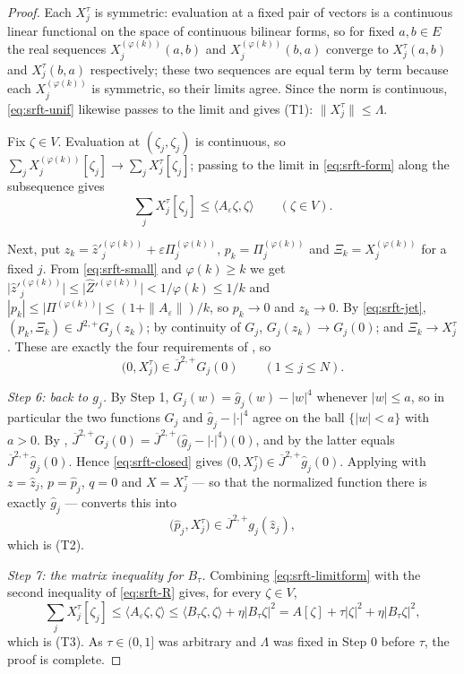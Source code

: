 \begin{proof}
Each $X_j^\tau$ is symmetric: evaluation at a fixed pair of vectors is a
continuous linear functional on the space of continuous bilinear forms, so for
fixed $a,b\in E$ the real sequences $X_j^{(\varphi(k))}(a,b)$ and
$X_j^{(\varphi(k))}(b,a)$ converge to $X_j^\tau(a,b)$ and $X_j^\tau(b,a)$
respectively; these two sequences are equal term by term because each
$X_j^{(\varphi(k))}$ is symmetric, so their limits agree. Since the norm is
continuous, \eqref{eq:srft-unif} likewise passes to the limit and gives (T1):
$\|X_j^\tau\|\le\Lambda$.

Fix $\zeta\in V$. Evaluation at $(\zeta_j,\zeta_j)$ is continuous, so
$\sum_jX_j^{(\varphi(k))}[\zeta_j]\to\sum_jX_j^\tau[\zeta_j]$; passing to the
limit in \eqref{eq:srft-form} along the subsequence gives
\begin{equation}\label{eq:srft-limitform}
  \sum_jX_j^\tau[\zeta_j]\le\langle A_\varepsilon\zeta,\zeta\rangle
  \qquad(\zeta\in V).
\end{equation}

Next, put $z_k=\widehat z'^{(\varphi(k))}_j+\varepsilon\Pi_j^{(\varphi(k))}$,
$p_k=\Pi_j^{(\varphi(k))}$ and $\Xi_k=X_j^{(\varphi(k))}$ for a fixed $j$. From
\eqref{eq:srft-small} and $\varphi(k)\ge k$ we get
$\bigl|\widehat z'^{(\varphi(k))}_j\bigr|
\le\bigl|\widehat Z'^{(\varphi(k))}\bigr|<1/\varphi(k)\le1/k$ and
$|p_k|\le\bigl|\Pi^{(\varphi(k))}\bigr|\le(1+\|A_\varepsilon\|)/k$, so
$p_k\to0$ and $z_k\to0$. By \eqref{eq:srft-jet},
$(p_k,\Xi_k)\in J^{2,+}G_j(z_k)$; by continuity of $G_j$, $G_j(z_k)\to G_j(0)$;
and $\Xi_k\to X_j^\tau$. These are exactly the four requirements of
, so
\begin{equation}\label{eq:srft-closed}
  \bigl(0,X_j^\tau\bigr)\in\overline J^{2,+}G_j(0)\qquad(1\le j\le N).
\end{equation}

\emph{Step 6: back to $g_j$.}
By Step 1, $G_j(w)=\widehat g_j(w)-|w|^4$ whenever $|w|\le a$, so in particular
the two functions $G_j$ and $\widehat g_j-|\cdot|^4$ agree on the ball
$\{|w|<a\}$ with $a>0$. By ,
$\overline J^{2,+}G_j(0)=\overline J^{2,+}\bigl(\widehat g_j-|\cdot|^4\bigr)(0)$,
and by  the latter equals
$\overline J^{2,+}\widehat g_j(0)$. Hence \eqref{eq:srft-closed} gives
$\bigl(0,X_j^\tau\bigr)\in\overline J^{2,+}\widehat g_j(0)$. Applying
 with $z=\widehat z_j$, $p=\widehat p_j$,
$q=0$ and $X=X_j^\tau$ --- so that the normalized function there is exactly
$\widehat g_j$ --- converts this into
\[
  \bigl(\widehat p_j,X_j^\tau\bigr)\in\overline J^{2,+}g_j(\widehat z_j),
\]
which is (T2).

\emph{Step 7: the matrix inequality for $B_\tau$.}
Combining \eqref{eq:srft-limitform} with the second inequality of
\eqref{eq:srft-R} gives, for every $\zeta\in V$,
\[
  \sum_jX_j^\tau[\zeta_j]\le\langle A_\varepsilon\zeta,\zeta\rangle
   \le\langle B_\tau\zeta,\zeta\rangle+\eta|B_\tau\zeta|^2
   =A[\zeta]+\tau|\zeta|^2+\eta|B_\tau\zeta|^2,
\]
which is (T3). As $\tau\in(0,1]$ was arbitrary and $\Lambda$ was fixed in
Step 0 before $\tau$, the proof is complete.
\end{proof}
